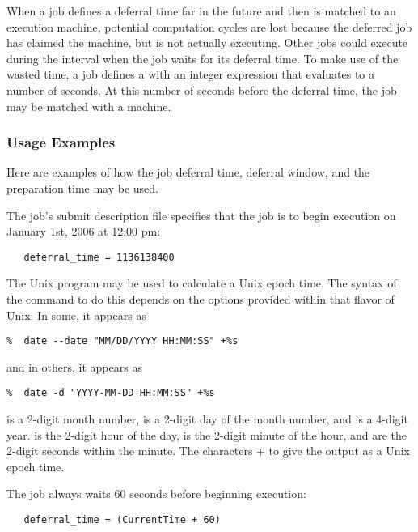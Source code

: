 When a job defines a deferral time far in the future and then 
is matched to an execution machine,
potential computation cycles are lost because the deferred job
has claimed the machine, but is not actually executing. 
Other jobs could execute during the interval when the job 
waits for its deferral time.
To make use of the wasted time,
a job defines a 
with an integer expression that evaluates to a
number of seconds.
At this number of seconds before the deferral time,
the job may be matched with a machine.

\subsubsection{Usage Examples}
\label{sec:JobDeferral-Examples}

Here are examples of how the job deferral time,
deferral window, and the preparation time may be used.

The job's submit description file specifies that
the job is to begin execution 
on January 1st, 2006 at 12:00 pm:

\begin{verbatim} 
   deferral_time = 1136138400
\end{verbatim} 

The Unix  program may be used to calculate
a Unix epoch time.
The syntax of the command to do this depends on the options provided
within that flavor of Unix.  In some, it appears as
\begin{verbatim} 
%  date --date "MM/DD/YYYY HH:MM:SS" +%s
\end{verbatim} 
and in others, it appears as 
\begin{verbatim} 
%  date -d "YYYY-MM-DD HH:MM:SS" +%s
\end{verbatim} 

\verb@MM@ is a 2-digit month number,
\verb@DD@ is a 2-digit day of the month number, and
\verb@YYYY@ is a 4-digit year.
\verb@HH@ is the 2-digit hour of the day,
\verb@MM@ is the 2-digit minute of the hour, and
\verb@SS@ are the 2-digit seconds within the minute.
The characters \verb@+%s@ tell the \Prog{date} program
to give the output as a Unix epoch time.

The job always waits 60 seconds before
beginning execution:

\begin{verbatim} 
   deferral_time = (CurrentTime + 60)
\end{verbatim}

